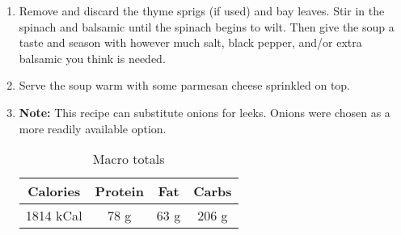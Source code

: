 \documentclass{report}
\begin{document}
\begin{multicols}{2}
\begin{enumerate}
\item Remove and discard the thyme sprigs (if used) and bay leaves.  Stir in the spinach and balsamic until the spinach begins to wilt.  Then give the soup a taste and season with however much salt, black pepper, and/or extra balsamic you think is needed.

\item Serve the soup warm with some parmesan cheese sprinkled on top.
\item \textbf{Note:} This recipe can substitute onions for leeks. Onions were chosen as a more readily available option. 



\begin{table}[H]
  \begin{center}
    \caption{Macro totals}
    \label{tab:table1}
    \begin{tabular}{c|c|c|c} %
      \textbf{Calories} & \textbf{Protein} & \textbf{Fat} & \textbf{Carbs}\\
      \hline
      1814 kCal & 78 g & 63 g & 206 g\\
    \end{tabular}
  \end{center}
\end{table}
 
\end{enumerate}
\end{multicols}




\end{document}

